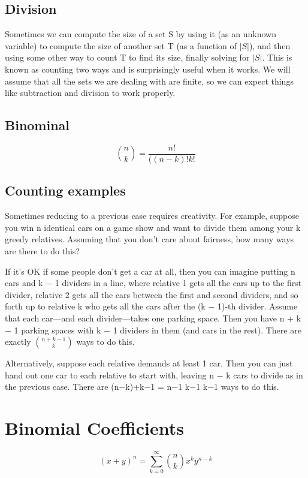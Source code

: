 \documentclass[twoside]{article}
\begin{document}
\subsection{Division}
Sometimes we can compute the size of a set S by using it (as an unknown variable) to compute the size of another set T (as a function of $|S|$), and then using some other way to count T to find its size, finally solving for $|S|$. This is known as counting two ways and is surprisingly useful when it works. We will assume that all the sets we are dealing with are finite, so we can expect things like subtraction and division to work properly.

\subsection{Binominal}
\begin{equation}
{n \choose k} = \frac{n!}{((n-k)!k!}
\end{equation}

\subsection{Counting examples}

Sometimes reducing to a previous case requires creativity. For example, suppose you win n identical cars on a game show and want to divide them among your k greedy relatives. Assuming that you don’t care about fairness, how many ways are there to do this?

If it’s OK if some people don’t get a car at all, then you can imagine putting n cars and k − 1 dividers in a line, where relative 1 gets all the cars up to the first divider, relative 2 gets all the cars between the first and second dividers, and so forth up to relative k who gets all the cars after the (k − 1)-th divider. Assume that each car—and each divider—takes one parking space. Then you have n + k − 1 parking spaces with k − 1 dividers in them (and cars in the rest). There are exactly ${n+k-1  \choose k}$  ways to do this.

Alternatively, suppose each relative demands at least 1 car. Then you
can just hand out one car to each relative to start with, leaving n − k
cars to divide as in the previous case. There are  (n−k)+k−1  =  n−1  k−1 k−1
ways to do this.

\section{Binomial Coefficients}
\begin{equation}
(x+y)^n = \sum_{k=0}^{\infty} {n \choose k} x^k y^{n-k}
\end{equation}
\end{document}
